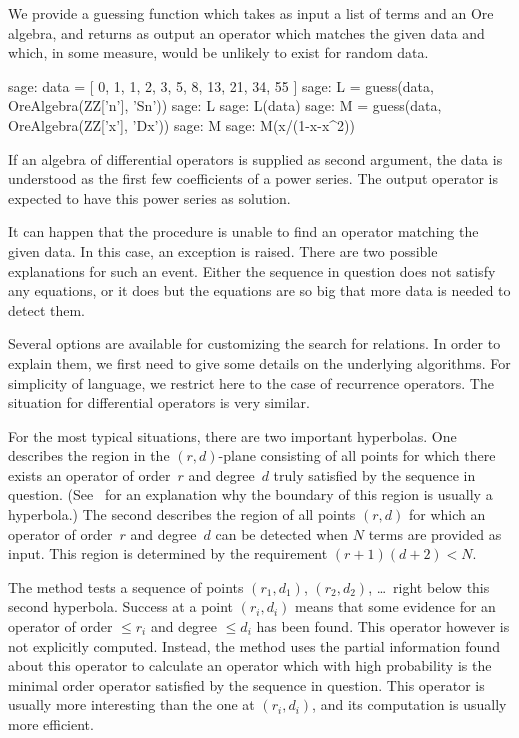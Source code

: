 \documentclass{llncs}
\begin{document}
We provide a guessing function which takes as input a list of terms and an Ore
algebra, and returns as output an operator which matches the given data and
which, in some measure, would be unlikely to exist for random data.

\begin{sageexample}
  sage: data = [ 0, 1, 1, 2, 3, 5, 8, 13, 21, 34, 55 ]
  sage: L = guess(data, OreAlgebra(ZZ['n'], 'Sn'))
  sage: L
  sage: L(data)
  sage: M = guess(data, OreAlgebra(ZZ['x'], 'Dx'))
  sage: M
  sage: M(x/(1-x-x^2))
\end{sageexample}

If an algebra of differential operators is supplied as second argument, the data
is understood as the first few coefficients of a power series. The output
operator is expected to have this power series as solution.

It can happen that the procedure is unable to find an operator matching the 
given data. In this case, an exception is raised. There are two possible 
explanations for such an event. Either the sequence in question does not 
satisfy any equations, or it does but the equations are so big that more
data is needed to detect them. 

Several options are available for customizing the search for relations.  In
order to explain them, we first need to give some details on the underlying
algorithms. For simplicity of language, we restrict here to the case of
recurrence operators. The situation for differential operators is very similar.

For the most typical situations, there are two important hyperbolas. One
describes the region in the $(r,d)$-plane consisting of all points for which
there exists an operator of order~$r$ and degree~$d$ truly satisfied by the
sequence in question. (See~\cite{jaroschek13a} for an explanation why the
boundary of this region is usually a hyperbola.) The second describes the region
of all points $(r,d)$ for which an operator of order~$r$ and degree~$d$ can be
detected when $N$ terms are provided as input. This region is determined by the
requirement $(r+1)(d+2)<N$.

The method tests a sequence of points $(r_1,d_1)$, $(r_2,d_2)$, \dots\ right
below this second hyperbola. Success at a point $(r_i,d_i)$ means that some
evidence for an operator of order $\leq r_i$ and degree $\leq d_i$ has been found. 
This operator however is not explicitly computed. Instead, the method uses the
partial information found about this operator to calculate an operator which with 
high probability is the minimal order operator satisfied by the sequence in question. 
This operator is usually more interesting than the one at $(r_i,d_i)$, and its 
computation is usually more efficient. 
\end{document}

